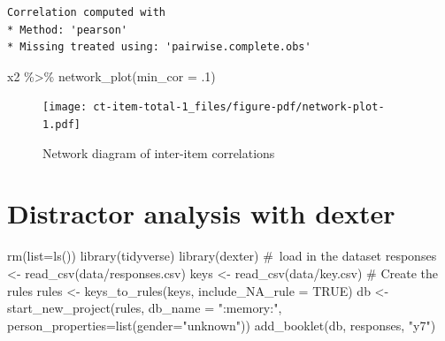 \documentclass[
  letterpaper,
  DIV=11,
  numbers=noendperiod]{scrreprt}
\newenvironment{Shaded}{\begin{snugshade}}{\end{snugshade}}
\newcommand{\AttributeTok}[1]{\textcolor[rgb]{0.40,0.45,0.13}{#1}}
\newcommand{\CommentTok}[1]{\textcolor[rgb]{0.37,0.37,0.37}{#1}}
\newcommand{\ConstantTok}[1]{\textcolor[rgb]{0.56,0.35,0.01}{#1}}
\newcommand{\DecValTok}[1]{\textcolor[rgb]{0.68,0.00,0.00}{#1}}
\newcommand{\FunctionTok}[1]{\textcolor[rgb]{0.28,0.35,0.67}{#1}}
\newcommand{\NormalTok}[1]{\textcolor[rgb]{0.00,0.23,0.31}{#1}}
\newcommand{\OtherTok}[1]{\textcolor[rgb]{0.00,0.23,0.31}{#1}}
\newcommand{\SpecialCharTok}[1]{\textcolor[rgb]{0.37,0.37,0.37}{#1}}
\newcommand{\StringTok}[1]{\textcolor[rgb]{0.13,0.47,0.30}{#1}}
\begin{document}
\begin{verbatim}
Correlation computed with
* Method: 'pearson'
* Missing treated using: 'pairwise.complete.obs'
\end{verbatim}

\begin{Shaded}
\begin{Highlighting}[]
\NormalTok{x2 }\SpecialCharTok{\%\textgreater{}\%} \FunctionTok{network\_plot}\NormalTok{(}\AttributeTok{min\_cor =}\NormalTok{ .}\DecValTok{1}\NormalTok{)}
\end{Highlighting}
\end{Shaded}

\begin{figure}[H]

{\centering \texttt{[image: ct-item-total-1\_files/figure-pdf/network-plot-1.pdf]}

}

\caption{Network diagram of inter-item correlations}

\end{figure}

\hypertarget{distractor-analysis-with-dexter}{%
\chapter{Distractor analysis with
dexter}\label{distractor-analysis-with-dexter}}

\begin{Shaded}
\begin{Highlighting}[]
\FunctionTok{rm}\NormalTok{(}\AttributeTok{list=}\FunctionTok{ls}\NormalTok{())}
\FunctionTok{library}\NormalTok{(tidyverse)}
\FunctionTok{library}\NormalTok{(dexter)}
\CommentTok{\# load in the dataset}
\NormalTok{responses }\OtherTok{\textless{}{-}} \FunctionTok{read\_csv}\NormalTok{(}\StringTok{\textquotesingle{}data/responses.csv\textquotesingle{}}\NormalTok{)}
\NormalTok{keys }\OtherTok{\textless{}{-}} \FunctionTok{read\_csv}\NormalTok{(}\StringTok{\textquotesingle{}data/key.csv\textquotesingle{}}\NormalTok{)}
\CommentTok{\# Create the rules}
\NormalTok{rules }\OtherTok{\textless{}{-}} \FunctionTok{keys\_to\_rules}\NormalTok{(keys, }\AttributeTok{include\_NA\_rule =} \ConstantTok{TRUE}\NormalTok{)}
\NormalTok{db }\OtherTok{\textless{}{-}} \FunctionTok{start\_new\_project}\NormalTok{(rules, }\AttributeTok{db\_name =} \StringTok{":memory:"}\NormalTok{, }\AttributeTok{person\_properties=}\FunctionTok{list}\NormalTok{(}\AttributeTok{gender=}\StringTok{"unknown"}\NormalTok{))}
\FunctionTok{add\_booklet}\NormalTok{(db, responses, }\StringTok{"y7"}\NormalTok{) }
\end{Highlighting}
\end{Shaded}
\end{document}
